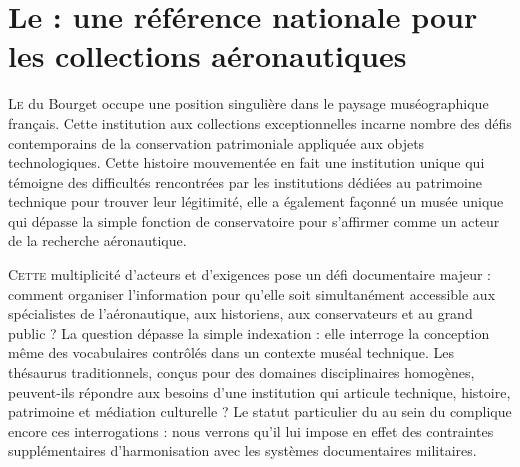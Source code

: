 \chapter[Une référence nationale]{\label{I-A}Le \mae : une référence nationale pour les collections aéronautiques}

\lettrine{L}e \maelong du Bourget occupe une position singulière dans le paysage muséographique français. Cette institution aux collections exceptionnelles incarne nombre des défis contemporains de la conservation patrimoniale appliquée aux objets technologiques. Cette histoire mouvementée en fait une institution unique qui témoigne des difficultés rencontrées par les institutions dédiées au patrimoine technique pour trouver leur légitimité, elle a également façonné un musée unique qui dépasse la simple fonction de conservatoire pour s'affirmer comme un acteur de la recherche aéronautique.






\bigskip
\bigskip
\bigskip

\lettrine{C}{ette} multiplicité d'acteurs et d'exigences pose un défi documentaire majeur : comment organiser l'information pour qu'elle soit simultanément accessible aux spécialistes de l'aéronautique, aux historiens, aux conservateurs et au grand public ? La question dépasse la simple indexation : elle interroge la conception même des vocabulaires contrôlés dans un contexte muséal technique. Les thésaurus traditionnels, conçus pour des domaines disciplinaires homogènes, peuvent-ils répondre aux besoins d'une institution qui articule technique, histoire, patrimoine et médiation culturelle ?
Le statut particulier du \mae au sein du \minarm complique encore ces interrogations : nous verrons qu'il lui impose en effet des contraintes supplémentaires d'harmonisation avec les systèmes documentaires militaires.